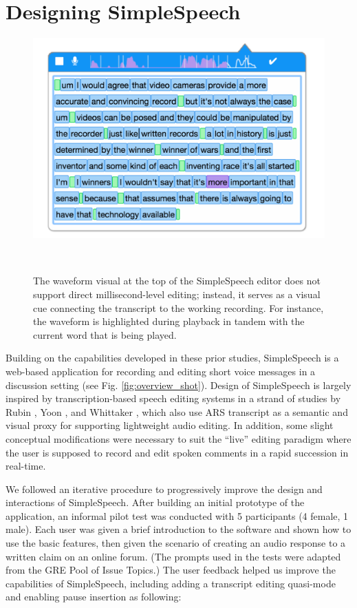 
\section{Designing SimpleSpeech}

\begin{figure}
	\centering
	\includegraphics[width=\columnwidth,keepaspectratio]{figures/playback}
	\caption{The waveform visual at the top of the SimpleSpeech editor does not support direct millisecond-level editing; instead, it serves as a visual cue connecting the transcript to the working recording. For instance, the waveform is highlighted during playback in tandem with the current word that is being played.}~\label{fig:playback}
\end{figure}

Building on the capabilities developed in these prior studies, SimpleSpeech is a web-based application for recording and editing short voice messages in a discussion setting (see Fig. \ref{fig:overview_shot}).
Design of SimpleSpeech is largely inspired by transcription-based speech editing systems in a strand of  studies by Rubin \cite{rubin}, Yoon \cite{yoon}, and Whittaker \cite{whittaker_semantic}, which also use ARS transcript as a semantic and visual proxy for supporting lightweight audio editing.
In addition, some slight conceptual modifications were necessary to suit the ``live'' editing paradigm where the user is supposed to record and edit spoken comments in a rapid succession in real-time.

We followed an iterative procedure to progressively improve the design and interactions of SimpleSpeech.
After building an initial prototype of the application, an informal pilot test was conducted with 5 participants (4 female, 1 male). 
Each user was given a brief introduction to the software and shown how to use the basic features, then given the scenario of creating an audio response to a written claim on an online forum. 
(The prompts used in the tests were adapted from the GRE Pool of Issue Topics.)
The user feedback helped us improve the capabilities of SimpleSpeech, including adding a transcript editing quasi-mode and enabling pause insertion as following:

